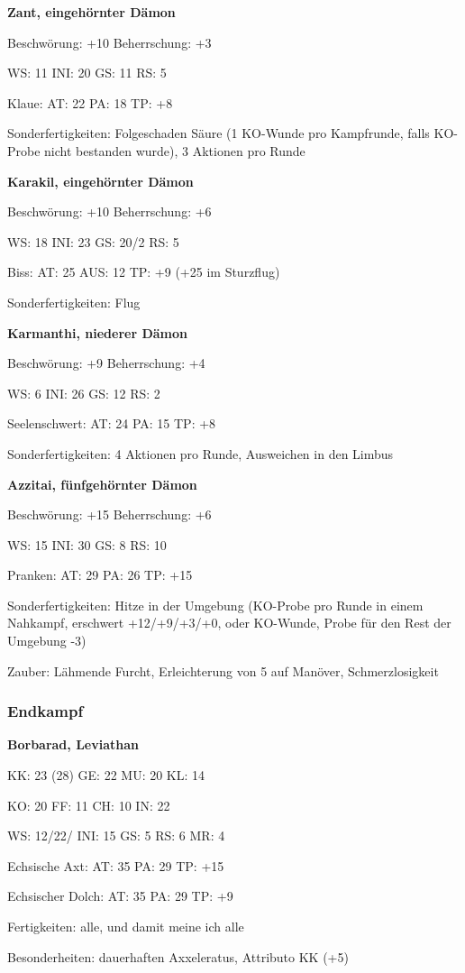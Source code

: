 {\small
\textbf{Zant, eingehörnter Dämon}

Beschwörung: +10 \quad Beherrschung: +3

WS: 11 \quad INI: 20 \quad GS: 11 \quad RS: 5

Klaue: AT: 22 \quad PA: 18 \quad TP: +8

Sonderfertigkeiten: Folgeschaden Säure (1 KO-Wunde pro Kampfrunde, falls KO-Probe nicht bestanden wurde), 3 Aktionen pro Runde

\par\bigskip

\textbf{Karakil, eingehörnter Dämon}

Beschwörung: +10 \quad Beherrschung: +6

WS: 18 \quad INI: 23 \quad GS: 20/2 \quad RS: 5

Biss: AT: 25 \quad AUS: 12 \quad TP: +9 (+25 im Sturzflug)

Sonderfertigkeiten: Flug \par\bigskip

\textbf{Karmanthi, niederer Dämon}

Beschwörung: +9 \quad Beherrschung: +4

WS: 6 \quad INI: 26 \quad GS: 12 \quad RS: 2

Seelenschwert: AT: 24 PA: 15 TP: +8

Sonderfertigkeiten: 4 Aktionen pro Runde, Ausweichen in den Limbus \par\bigskip 

\textbf{Azzitai, fünfgehörnter Dämon}

Beschwörung: +15 \quad Beherrschung: +6

WS: 15 \quad INI: 30 \quad GS: 8 \quad RS: 10

Pranken: AT: 29 \quad PA: 26 \quad TP: +15

Sonderfertigkeiten: Hitze in der Umgebung (KO-Probe pro Runde in einem Nahkampf, erschwert +12/+9/+3/+0, oder KO-Wunde, Probe für den Rest der Umgebung -3)

Zauber: Lähmende Furcht, Erleichterung von 5 auf Manöver, Schmerzlosigkeit\par\bigskip

}

\subsubsection{Endkampf}



{\small
\textbf{Borbarad, Leviathan}

KK: 23 (28) \quad GE: 22 \quad MU: 20 \quad KL: 14

KO: 20 \quad FF: 11 \quad CH: 10 \quad IN: 22

WS: 12/22/ \quad INI: 15 \quad GS: 5 \quad RS: 6 \quad MR: 4

Echsische Axt: AT: 35  PA: 29 \quad TP: +15

Echsischer Dolch: AT: 35  PA: 29 \quad TP: +9

Fertigkeiten: alle, und damit meine ich alle

Besonderheiten: dauerhaften Axxeleratus, Attributo KK (+5) \par\bigskip
}

